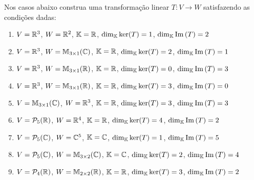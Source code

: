 \documentclass[12pt]{exam}
\begin{document}
\begin{exercicio}
  Nos casos abaixo construa uma transformação linear $T : V \to W$ satisfazendo as condições dadas:
  \begin{enumerate}[label={\alph*})]
    \item $V = \mathbb{R}^3$, $W = \mathbb{R}^2$, $\mathbb{K} = \mathbb{R}$, $\dim_{\mathbb{K}} \ker(T) = 1$, $\dim_{\mathbb{K}} {\rm Im\,}(T) = 2$

    \item $V = \mathbb{R}^3$, $W = \mathbb{M}_{3\times 1}(\mathbb{C})$, $\mathbb{K} = \mathbb{R}$, $\dim_{\mathbb{K}} \ker(T) = 2$, $\dim_{\mathbb{K}} {\rm Im\,}(T) = 1$

    \item $V = \mathbb{R}^3$, $W = \mathbb{M}_{3\times 1}(\mathbb{R})$, $\mathbb{K} = \mathbb{R}$, $\dim_{\mathbb{K}} \ker(T) = 0$, $\dim_{\mathbb{K}} {\rm Im\,}(T) = 3$

    \item $V = \mathbb{R}^3$, $W = \mathbb{M}_{3\times 1}(\mathbb{R})$, $\mathbb{K} = \mathbb{R}$, $\dim_{\mathbb{K}} \ker(T) = 3$, $\dim_{\mathbb{K}} {\rm Im\,}(T) = 0$

    \item $V = \mathbb{M}_{3\times 1}(\mathbb{C})$, $W = \mathbb{R}^3$, $\mathbb{K} = \mathbb{R}$, $\dim_{\mathbb{K}} \ker(T) = 3$, $\dim_{\mathbb{K}} {\rm Im\,}(T) = 3$

    \item $V = \mathcal{P}_5(\mathbb{R})$, $W = \mathbb{R}^4$, $\mathbb{K} = \mathbb{R}$, $\dim_{\mathbb{K}} \ker(T) = 4$, $\dim_{\mathbb{K}} {\rm Im\,}(T) = 2$

    \item $V = \mathcal{P}_5(\mathbb{C})$, $W = \mathbb{C}^5$, $\mathbb{K} = \mathbb{C}$, $\dim_{\mathbb{K}} \ker(T) = 1$, $\dim_{\mathbb{K}} {\rm Im\,}(T) = 5$

    \item $V = \mathcal{P}_5(\mathbb{C})$, $W = \mathbb{M}_{3\times 2}(\mathbb{C})$, $\mathbb{K} = \mathbb{C}$, $\dim_{\mathbb{K}} \ker(T) = 2$, $\dim_{\mathbb{K}} {\rm Im\,}(T) = 4$

    \item $V = \mathcal{P}_4(\mathbb{R})$, $W = \mathbb{M}_{2\times 2}(\mathbb{R})$, $\mathbb{K} = \mathbb{R}$, $\dim_{\mathbb{K}} \ker(T) = 3$, $\dim_{\mathbb{K}} {\rm Im\,}(T) = 2$
  \end{enumerate}
\end{exercicio}
\end{document}
